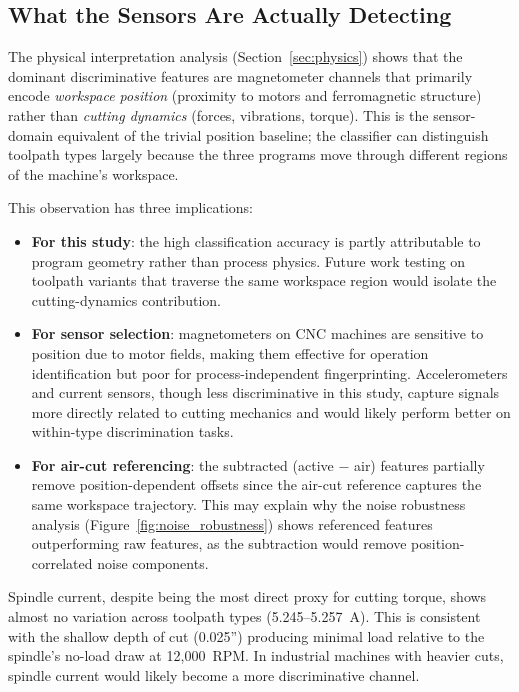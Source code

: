 \subsection{What the Sensors Are Actually Detecting}

The physical interpretation analysis (Section~\ref{sec:physics}) shows that the dominant discriminative features are magnetometer channels that primarily encode \emph{workspace position} (proximity to motors and ferromagnetic structure) rather than \emph{cutting dynamics} (forces, vibrations, torque). This is the sensor-domain equivalent of the trivial position baseline; the classifier can distinguish toolpath types largely because the three programs move through different regions of the machine's workspace.

This observation has three implications:
\begin{itemize}
    \item \textbf{For this study}: the high classification accuracy is partly attributable to program geometry rather than process physics. Future work testing on toolpath variants that traverse the same workspace region would isolate the cutting-dynamics contribution.
    \item \textbf{For sensor selection}: magnetometers on CNC machines are sensitive to position due to motor fields, making them effective for operation identification but poor for process-independent fingerprinting. Accelerometers and current sensors, though less discriminative in this study, capture signals more directly related to cutting mechanics and would likely perform better on within-type discrimination tasks.
    \item \textbf{For air-cut referencing}: the subtracted (active $-$ air) features partially remove position-dependent offsets since the air-cut reference captures the same workspace trajectory. This may explain why the noise robustness analysis (Figure~\ref{fig:noise_robustness}) shows referenced features outperforming raw features, as the subtraction would remove position-correlated noise components.
\end{itemize}

Spindle current, despite being the most direct proxy for cutting torque, shows almost no variation across toolpath types (5.245--5.257~A). This is consistent with the shallow depth of cut (0.025'') producing minimal load relative to the spindle's no-load draw at 12{,}000~RPM. In industrial machines with heavier cuts, spindle current would likely become a more discriminative channel.


